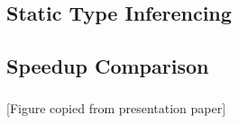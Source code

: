 \documentclass[mathserif,10pt]{beamer}
\begin{document}
\subsection{Static Type Inferencing}
\frame
{
  \frametitle{\subsecname}
  \begin{figure}[h]
  \centering
  \end{figure}
}

\subsection{Speedup Comparison}
\frame
{
  \frametitle{\subsecname}
  \begin{figure}[h]
  \centering
  \end{figure}
  [Figure copied from presentation paper]
}
\end{document}
